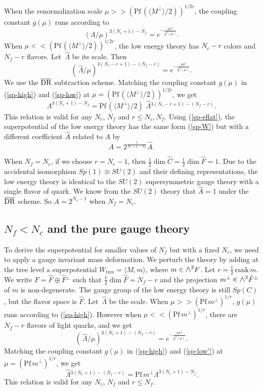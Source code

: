 \documentclass[lecture]{qft-l}
\newcommand{\Lam}{\varLambda}
\newcommand{\medwedge}{\mbox{\fontsize{12pt}{0pt}\selectfont $\wedge$}}
\newcommand{\bra}{\langle}
\newcommand{\ket}{\rangle}
\newcommand{\inv}[1]{\frac{1}{#1}}
\newcommand{\hf}{{\textstyle \inv{2}}}
\newcommand{\e}[1]{e^{{#1}}}
\newcommand{\rank}{\mathrm{\,rank\,}}
\newcommand{\Pf}{\mathrm{Pf\,}}
\newcommand{\tree}{_\mathrm{tree}}
\newcommand{\hLam}{\,\hat{\!\Lam}{}}
\newcommand{\hC}{\hat{C}{}}
\newcommand{\hF}{\hat{F}{}}
\newcommand{\Mperp}{\bra M^\perp\ket}
\def\Subhead#1{\subsection*{#1}}
\begin{document}
When the renormalization scale $\mu>>(\Pf(\Mperp/2))^{1/2r}$,
the coupling constant $g(\mu)$ runs according to
	\begin{equation}\label{sp-high}
(\Lam/\mu)^{3(N_c+1)-N_f}=\e{-\frac{8\pi^2}{g^2(\mu)}}.
	\end{equation}
When $\mu<<(\Pf(\Mperp/2))^{1/2r}$, the low energy theory has $N_c-r$ colors
and $N_f-r$ flavors.
Let $\hLam$ be its scale.
Then
	\begin{equation}\label{sp-low}
(\hLam/\mu)^{3(N_c-r+1)-(N_f-r)}=\e{-\frac{8\pi^2}{g^2(\mu)}}.
	\end{equation}
We use the $\overline{{\rm DR}}$ subtraction scheme.
Matching the coupling constant $g(\mu)$ in (\ref{sp-high}) and (\ref{sp-low})
at $\mu=(\Pf(\Mperp/2))^{1/2r}$, we get
	\begin{equation}\label{sp-eflat}
\Lam^{3(N_c+1)-N_f}=\Pf(\Mperp/2)\,\hLam^{3(N_c-r+1)-(N_f-r)}.
	\end{equation}
This relation is valid for any $N_c$, $N_f$ and $r\le N_c,N_f$.
Using (\ref{sp-eflat}), the superpotential of the low energy
theory has the same form (\ref{sp-W}) but with a different coefficient 
$\hat{A}$ related to $A$ by
	\begin{equation}
A=2^{\frac{r}{N_c+1-N_f}}\hat{A}.
	\end{equation}

When $N_f=N_c$, if we choose $r=N_c-1$, then $\hf\dim\hC=\hf\dim\hF=1$.
Due to the accidental isomorphism $Sp(1)\cong SU(2)$ and their defining 
representations, the low energy theory is identical to the $SU(2)$
supersymmetric gauge theory with a single flavor of quark.
We know from the $SU(2)$ theory that $\hat{A}=1$ 
under the $\overline{{\rm DR}}$ scheme.
So $A=2^{N_c-1}$ when $N_f=N_c$.


\Subhead{{\boldmath $N_f<N_c$} and the pure gauge theory}

To derive the superpotential for smaller values of $N_f$ but with a fixed
$N_c$, we need to apply a gauge invariant mass deformation.
We perturb the theory by adding at the tree level a superpotential
$W\tree=\bra M,m\ket$, where $m\in\medwedge^2F$.
Let $r=\hf\rank m$.
We write $F=\hF\oplus\hF^\perp$ such that $\hf\dim\hF=N_f-r$ and 
the projection $m^\perp\in\medwedge^2\hF^\perp$ of $m$ is non-degenerate.
The gauge group of the low energy theory is still $Sp(C)$,
but the flavor space is $\hF$.
Let $\hLam$ be the scale.
When $\mu>>(\Pf m^\perp)^{1/r}$, $g(\mu)$ runs according to (\ref{sp-high}).
However when $\mu<<(\Pf m^\perp)^{1/r}$, there are $N_f-r$ flavors of 
light quarks, and we get
	\begin{equation}\label{sp-low'}
(\hLam/\mu)^{3(N_c+1)-(N_f-r)}=\e{-\frac{8\pi^2}{g^2(\mu)}}.
	\end{equation}
Matching the coupling constant $g(\mu)$ in (\ref{sp-high}) and (\ref{sp-low'})
at $\mu=(\Pf m^\perp)^{1/r}$, we get
	\begin{equation}\label{sp-emass}
\hLam^{3(N_c+1)-(N_f-r)}=\Pf m^\perp\Lam^{3(N_c+1)-N_f}.
	\end{equation}
This relation is valid for any $N_c$, $N_f$ and $r\le N_f$.
\end{document}
